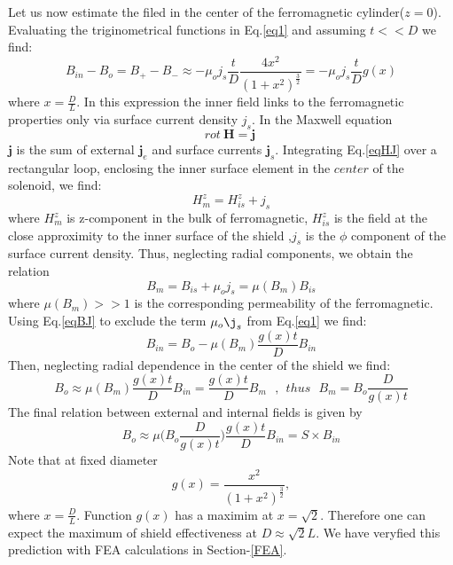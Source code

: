 \documentclass[12pt]{article}
\begin{document}
Let us now estimate the filed in the center of the ferromagnetic cylinder($z=0$).
Evaluating the triginometrical functions in  Eq.\ref{eq1} and assuming  $t<<D$
we find:
%
\begin{equation}
B_{in}-B_o = B_+ - B_- \approx - \mu_o j_s  \frac{t}{D} \frac{4x^2} {(1+x^2)^{\frac{3}{2}}}
= - \mu_o j_s \frac{t}{D} g(x)
\label{eq101}
\end{equation}
where $x=\frac{D}{L}$.
%
In this expression the inner field  links to the  ferromagnetic properties  only via surface current density  $j_s$.
In  the Maxwell equation
\begin{equation}
rot~\textbf{H} = \textbf{j} ~
\label{eqHJ}
\end{equation}
$\textbf{j}$ %
is the sum of external $\textbf{j}_e$  and
surface   currents   $\textbf{j}_s$.
Integrating Eq.\ref{eqHJ} over a rectangular loop,
enclosing the inner surface element in the $center$ of
the solenoid, we find:
%
\begin{equation}
                  H_m^z =H_{is}^z+j_s
\label{eqBJ1}
\end{equation}
%
where $H_m^z$ is   z-component  in the bulk of   ferromagnetic,
$H_{is}^z$ is the field at the close approximity to the
inner surface of the shield ,$j_s$ is the $\phi$ component of the
surface current density.
Thus, neglecting   radial components, we obtain the relation
%
\begin{equation}
B_m = B_{is}+\mu_o j_s=\mu(B_m)B_{is}   %
\label{eqBJ}
\end{equation}
%
where $\mu(B_m)>>1$ is the corresponding permeability  of the  ferromagnetic.
Using  Eq.\ref{eqBJ}  to exclude  the term $\mu_o \j_s$ from Eq.\ref{eq1} we find:
%
\begin{equation}
B_{in}=B_o - \mu(B_m)  \frac{g(x)t}{D}  B_{in}
\label{eq11}
\end{equation}
%
Then, neglecting radial dependence in the center of the shield we find:
%
\begin{equation}
B_{o}\approx
\mu(B_m)\frac{g(x)t}{D} B_{in}=
\frac{g(x)t}{D}B_{m}~~~, ~~ thus ~~~B_{m}=B_o\frac{D}{g(x)t}
\label{eq12}
\end{equation}
%
The final relation between external and internal fields is given by
%
\begin{equation}
B_o \approx \mu\bigg(B_o \frac{D}{g(x)t}\bigg) \frac{g(x)t }{D} B_{in}=S \times B_{in}
\label{eqfinal}
\end{equation}
%
Note that at fixed diameter
%
\begin{equation}
 g(x)=\frac{x^2}{(1+x^2)^{\frac{3}{2}}},
\label{sf01}
\end{equation}
where  $x=\frac{D}{L}$.  Function $g(x)$ has a maximim at $x=\sqrt2$.
 Therefore one can expect the maximum of shield effectiveness
 at $D \approx \sqrt2L$. 
We have veryfied this prediction  with FEA calculations in Section-\ref{FEA}.
\end{document}
